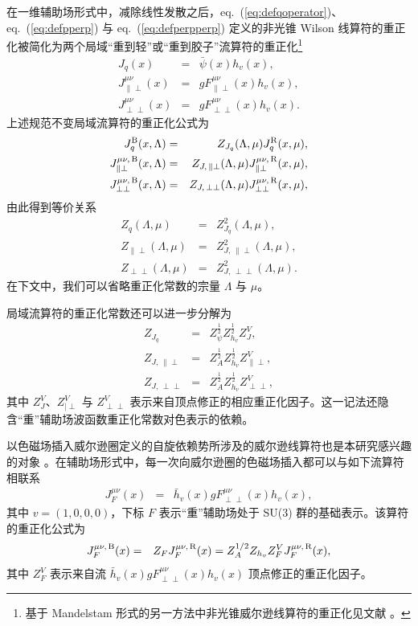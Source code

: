 在一维辅助场形式中，减除线性发散之后，eq.~(\ref{eq:defqoperator})、eq.~(\ref{eq:defpperp}) 与 eq.~(\ref{eq:defperpperp}) 定义的非光锥 Wilson 线算符的重正化被简化为两个局域``重到轻''或``重到胶子''流算符的重正化\footnote{基于 Mandelstam 形式的另一方法中非光锥威尔逊线算符的重正化见文献 \cite{Stefanis:1983ke,Stefanis:2012if}。}
\begin{eqnarray}
\label{eq:currentoperator}
J_q(x) &=& \bar{\psi}(x) h_v(x),\\
J^{\mu\nu}_{\|\perp}(x) &=& gF_{\|\perp}^{\mu\nu}(x)h_v(x),\\
J^{\mu\nu}_{\perp\perp}(x) &=& gF_{\perp\perp}^{\mu\nu}(x)h_v(x).
\end{eqnarray}
上述规范不变局域流算符的重正化公式为
\begin{eqnarray}
J_q^{\rm B} (x, \Lambda) &=& Z_{J_q} (\Lambda,\mu)J_q^{\rm R}(x, \mu),\\
J^{\mu\nu,\, \rm B}_{\|\perp}(x, \Lambda) &=& Z_{J,\, \|\perp}(\Lambda,\mu)J^{\mu\nu,\, \rm R}_{\|\perp}(x, \mu),\\
J^{\mu\nu,\, \rm B}_{\perp\perp}(x, \Lambda) &=& Z_{J,\, \perp\perp}(\Lambda,\mu)J^{\mu\nu,\, \rm R}_{\perp\perp}(x, \mu),
\end{eqnarray}
由此得到等价关系
\begin{eqnarray}
Z_{q} (\Lambda,\mu)&=& Z_{J_q}^2(\Lambda,\mu),\\
Z_{\|\perp} (\Lambda,\mu)&=& Z^2_{J,\, \|\perp}(\Lambda,\mu),\\
Z_{\perp\perp} (\Lambda,\mu)&=& Z^2_{J,\, \perp\perp}(\Lambda,\mu).
\end{eqnarray}
在下文中，我们可以省略重正化常数的宗量 $\Lambda$ 与 $\mu$。

局域流算符的重正化常数还可以进一步分解为
\begin{eqnarray}
Z_{J_q} &=& Z_{\psi}^{\frac{1}{2}} Z_{h_v}^{\frac{1}{2}}Z^V_{J},\\
Z_{J,\, \|\perp} &=& Z_{A}^{\frac{1}{2}} Z_{h_v}^{\frac{1}{2}}Z^V_{\|\perp},\\
Z_{J,\, \perp\perp} &= & Z_{A}^{\frac{1}{2}} Z_{h_v}^{\frac{1}{2}}Z^V_{\perp\perp},
\end{eqnarray}
其中 $Z^V_{J}$、$Z^V_{|\perp}$ 与 $Z^V_{\perp\perp}$ 表示来自顶点修正的相应重正化因子。这一记法还隐含``重''辅助场波函数重正化常数对色表示的依赖。

以色磁场插入威尔逊圈定义的自旋依赖势所涉及的威尔逊线算符也是本研究感兴趣的对象 \cite{Brambilla:2000gk,Pineda:2000sz}。在辅助场形式中，每一次向威尔逊圈的色磁场插入都可以与如下流算符相联系
\begin{eqnarray}
\label{eq:currentoperatorspin}
J^{\mu\nu}_{F}(x) &=&\bar{h}_v(x)gF^{\mu\nu}_{\perp\perp}(x)h_v(x),
\end{eqnarray}
其中 $v=(1, 0,0,0)$，下标 $F$ 表示``重''辅助场处于 SU($3$) 群的基础表示。该算符的重正化公式为
\begin{eqnarray}
J^{\mu\nu,\, \rm B}_{F}(x)&=&Z_{F}J^{\mu\nu,\, \rm R}_{F}(x) = Z_{A}^{1/2} Z_{h_v}Z^V_{F}J^{\mu\nu,\, \rm R}_{F}(x),
\end{eqnarray}
其中 $Z^V_{F}$ 表示来自流 $\bar{h}_v(x)gF^{\mu\nu}_{\perp\perp}(x)h_v(x)$ 顶点修正的重正化因子。
